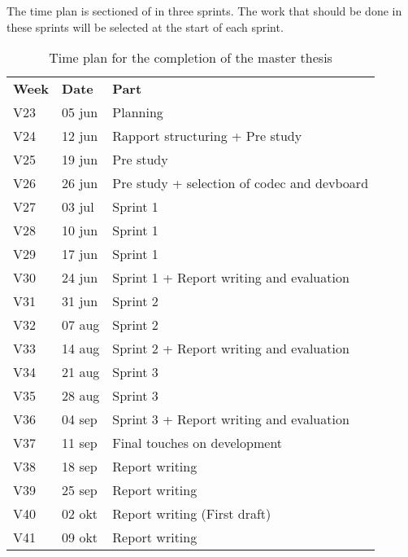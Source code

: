 The time plan is sectioned of in three sprints. The work that should be done in these sprints will be 
selected at the start of each sprint.

\begin{table}[]
	\caption{Time plan for the completion of the master thesis}
	\label{table:timeplan}
	\begin{tabular}{lll}
		\textbf{Week} & \textbf{Date} & \textbf{Part} \\
		V23 & 05 jun & Planning \\
		V24 & 12 jun & Rapport structuring + Pre study \\
		V25 & 19 jun & Pre study \\
		V26 & 26 jun & Pre study + selection of codec and devboard \\
		V27 & 03 jul & Sprint 1 \\
		V28 & 10 jun & Sprint 1 \\
		V29 & 17 jun & Sprint 1 \\
		V30 & 24 jun & Sprint 1 + Report writing and evaluation \\
		V31 & 31 jun & Sprint 2 \\
		V32 & 07 aug & Sprint 2 \\
		V33 & 14 aug & Sprint 2 + Report writing and evaluation \\
		V34 & 21 aug & Sprint 3 \\
		V35 & 28 aug & Sprint 3 \\
		V36 & 04 sep & Sprint 3 + Report writing and evaluation \\
		V37 & 11 sep & Final touches on development \\
		V38 & 18 sep & Report writing \\
		V39 & 25 sep & Report writing \\
		V40 & 02 okt & Report writing (First draft) \\
		V41 & 09 okt & Report writing
	\end{tabular}
\end{table}
